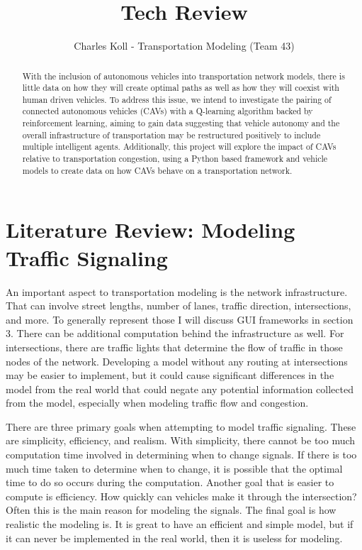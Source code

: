 \documentclass[10pt,letterpaper,draftclsnofoot,onecolumn]{IEEEtran}
\begin{document}
\author{Charles Koll - Transportation Modeling (Team 43)}
\title{Tech Review}
\maketitle

\begin{abstract}
With the inclusion of autonomous vehicles into transportation network models, there is little data on how they will create optimal paths as well as how they will coexist with human driven vehicles. To address this issue, we intend to investigate the pairing of connected autonomous vehicles (CAVs) with a Q-learning algorithm backed by reinforcement learning, aiming to gain data suggesting that vehicle autonomy and the overall infrastructure of transportation may be restructured positively to include multiple intelligent agents. Additionally, this project will explore the impact of CAVs relative to transportation congestion, using a Python based framework and vehicle models to create data on how CAVs behave on a transportation network.
\end{abstract}

\pagebreak

\section{Literature Review: Modeling Traffic Signaling}
An important aspect to transportation modeling is the network infrastructure. That can involve street lengths, number of lanes, traffic direction, intersections, and more. To generally represent those I will discuss GUI frameworks in section 3. There can be additional computation behind the infrastructure as well. For intersections, there are traffic lights that determine the flow of traffic in those nodes of the network. Developing a model without any routing at intersections may be easier to implement, but it could cause significant differences in the model from the real world that could negate any potential information collected from the model, especially when modeling traffic flow and congestion.

There are three primary goals when attempting to model traffic signaling. These are simplicity, efficiency, and realism. With simplicity, there cannot be too much computation time involved in determining when to change signals. If there is too much time taken to determine when to change, it is possible that the optimal time to do so occurs during the computation. Another goal that is easier to compute is efficiency. How quickly can vehicles make it through the intersection? Often this is the main reason for modeling the signals. The final goal is how realistic the modeling is. It is great to have an efficient and simple model, but if it can never be implemented in the real world, then it is useless for modeling.
\end{document}
